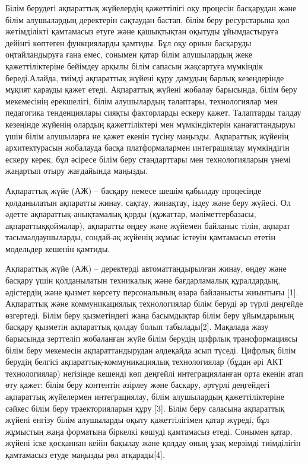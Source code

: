 Білім берудегі ақпараттық жүйелердің қажеттілігі оқу процесін басқарудан
және білім алушылардың деректерін сақтаудан бастап, білім беру
ресурстарына қол жетімділікті қамтамасыз етуге және қашықтықтан оқытуды
ұйымдастыруға дейінгі көптеген функцияларды қамтиды. Бұл оқу орнын
басқаруды оңтайландыруға ғана емес, сонымен қатар білім алушылардың жеке
қажеттіліктеріне бейімдеу арқылы білім сапасын жақсартуға мүмкіндік
береді.Алайда, тиімді ақпараттық жүйені құру дамудың барлық кезеңдерінде
мұқият қарауды қажет етеді. Ақпараттық жүйені жобалау барысында, білім
беру мекемесінің ерекшелігі, білім алушылардың талаптары, технологиялар
мен педагогика тенденциялары сияқты факторларды ескеру қажет. Талаптарды
талдау кезеңінде жүйенің олардың қажеттіліктері мен мүмкіндіктерін
қанағаттандыруы үшін білім алушыларға не қажет екенін түсіну маңызды.
Ақпараттық жүйенің архитектурасын жобалауда басқа платформалармен
интеграциялау мүмкіндігін ескеру керек, бұл әсіресе білім беру
стандарттары мен технологияларын үнемі жаңартып отыру жағдайында
маңызды.

Ақпараттық жүйе (АЖ) -- басқару немесе шешім қабылдау процесінде
қолданылатын ақпаратты жинау, сақтау, жинақтау, іздеу және беру жүйесі.
Ол әдетте ақпараттық-анықтамалық қорды (құжаттар, мәліметтербазасы,
ақпараттыққоймалар), ақпаратты өңдеу және жүйемен байланыс тілін,
ақпарат тасымалдаушыларды, сондай-ақ жүйенің жұмыс істеуін қамтамасыз
ететін модельдер кешенін қамтиды.

Ақпараттық жүйе (АЖ) -- деректерді автоматтандырылған жинау, өңдеу және
басқару үшін қолданылатын техникалық және бағдарламалық құралдардың,
әдістердің және қызмет көрсету персоналының өзара байланысты жиынтығы
{[}1{]}. Ақпараттық және коммуникациялық технологиялар білім беруді әр
түрлі деңгейде өзгертеді. Білім беру қызметіндегі жаңа басымдықтар білім
беру ұйымдарының басқару қызметін ақпараттық қолдау болып
табылады{[}2{]}. Мақалада жазу барысында зерттеліп жобаланған жүйе білім
берудің цифрлық трансформациясы білім беру мекемесін ақпараттандырудан
әлдеқайда асып түседі. Цифрлық білім берудің белгісі
ақпараттық-коммуникациялық технологиялар (бұдан әрі АКТ технологиялар)
негізінде кешенді көп деңгейлі интеграцияланған орта екенін атап өту
қажет: білім беру контентін әзірлеу және басқару, әртүрлі деңгейдегі
ақпараттық жүйелермен интеграциялау, білім алушылардың қажеттіліктеріне
сәйкес білім беру траекторияларын құру {[}3{]}. Білім беру саласына
ақпараттық жүйені енгізу білім алушыларды оқыту қажеттілігімен қатар
жүреді, бұл жұмыстың жаңа форматына біркелкі көшуді қамтамасыз етеді.
Сонымен қатар, жүйені іске қосқаннан кейін бақылау және қолдау оның ұзақ
мерзімді тиімділігін қамтамасыз етуде маңызды рөл атқарады{[}4{]}.

